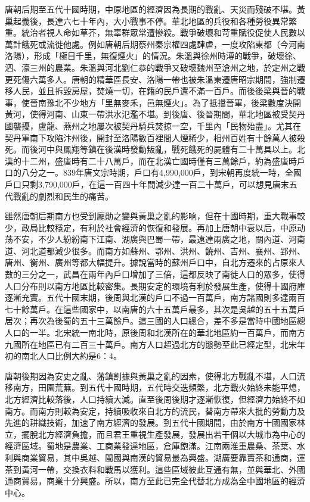 唐朝后期至五代十國時期，中原地區的經濟因為長期的戰亂、天災而殘破不堪。黃巢起義後，長達六七十年內，大小戰事不停。華北地區的兵役和各種勞役異常繁重。統治者視人命如草芥，無辜群眾常遭慘殺。戰爭破壞和苛重賦役促使人民數以萬計餓死或流徙他處。例如唐朝后期蔡州秦宗權四處肆虐，一度攻陷東都（今河南洛陽），形成「極目千里，無復煙火」的情況。朱溫與徐州時溥的戰爭，破壞徐、泗、濠三州的農業。朱溫與河北劉仁恭的戰爭又破壞魏州至滄州之地，於定州之戰更死傷六萬多人。唐朝的精華區長安、洛陽一帶也被朱溫東遷唐昭宗期間，強制遷移人民，並且拆毀房屋，焚燒一切，在籍的民戶還不滿一百戶。而後後梁與晉的戰事，使晉南豫北不少地方「里無麥禾，邑無煙火」。為了抵擋晉軍，後梁數度決開黃河，使得河南、山東一帶洪水氾濫不堪。到後唐、後晉期間，華北地區被受契丹國襲擾，盧龍、燕州之地屢次被契丹騎兵焚掠一空，千里內「民物殆盡」。尤其在契丹軍南下攻陷汴州後，開封至洛陽數百裡間人煙稀少，相州百姓有十餘萬人被殺死。而後河中與鳳翔等鎮在後漢時發動叛亂，戰死餓死的屍體有二十萬具以上。北漢的十二州，盛唐時有二十八萬戶，而在北漢亡國時僅有三萬餘戶，約為盛唐時戶口的八分之一。839年唐文宗時期，戶口有4,990,000戶，到宋朝再度統一時，全國戶口只剩3,790,000戶，在這一百四十年間減少達一百二十萬戶，可以想見唐末五代戰亂的劇烈和民生的痛苦。

雖然唐朝后期南方也受到龐勛之變與黃巢之亂的影响，但在十國時期，重大戰事較少，政局比較穩定，有利於社會經濟的恢復和發展。再加上唐朝中衰以后，中原动荡不安，不少人紛紛南下江南、湖廣與巴蜀一帶，最遠達兩廣之地，關內道、河南道、河北道都減少很多。而南方如蘇州、鄂州、洪州、饒州、吉州、襄州、郢州、唐州、衡州、廣州等都大幅提升。據說當時的蘇州戶口中，自北方遷來的占原來人數的三分之一，武昌在兩年內戶口增加了三倍，這都反映了南徙人口的眾多，使得人口分布則以南方地區比較密集。長期安定的環境有利於發展生產，使得十國府庫逐漸充實。五代十國末期，後周與北漢的戶口不過一百萬戶，南方諸國則多達兩百七十餘萬戶。在這些國家中，以南唐的六十五萬戶最多，其次是吳越的五十五萬戶居次；再次為後蜀的五十三萬餘戶。這三國的人口總合，差不多是當時中國地區總人口的一半。北宋統一南北時，原後周和北漢所在的華北地區約一百萬戶，而南方九國所在地區已有二百三十萬戶。南方人口超過北方的態勢至此已經定型，北宋年初的南北人口比例大約是6：4。

唐朝後期因為安史之亂、藩鎮割據與黃巢之亂的因素，使得北方戰亂不堪，人口流移南方，田園荒蕪。到五代十國時期，五代時交迭頻繁，北方戰火始終未能平熄，北方經濟比較落後，人口持續大減。直至後周後期才逐漸恢復，但經濟力始終不如南方。而南方則較為安定，持續吸收來自北方的流民，替南方帶來大批的勞動力及先進的耕織技術，加速了南方經濟的發展。到五代十國期間，由於南方十國國家林立，擺脫北方經濟負擔，而且君王重視生產發展，發展出若干個以大城市為中心的經濟區域。蜀地是農業、工商業發達地區，倉庫飽滿。江南兩淮重農桑、茶葉、水利與商業貿易，其中吳越、閩國與南漢的貿易最為興盛。湖廣要靠賣茶和通商，運茶到黃河一帶，交換衣料和戰馬以獲利。這些區域彼此互通有無，並與華北、外國通商貿易，商業十分興盛。所以，南方至此已完全代替北方成為全中國地區的經濟中心。

